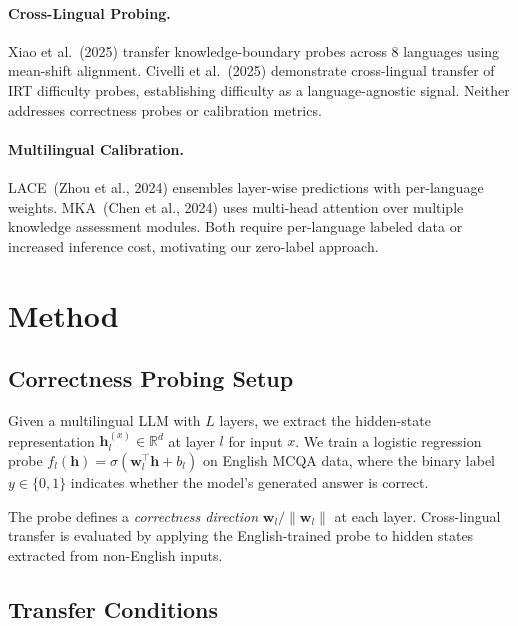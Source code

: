 \documentclass[11pt,a4paper]{article}
\begin{document}
\paragraph{Cross-Lingual Probing.}
Xiao et al.~(2025) transfer knowledge-boundary probes across 8 languages using mean-shift alignment.
Civelli et al.~(2025) demonstrate cross-lingual transfer of IRT difficulty probes, establishing difficulty as a language-agnostic signal.
Neither addresses correctness probes or calibration metrics.

\paragraph{Multilingual Calibration.}
LACE~(Zhou et al., 2024) ensembles layer-wise predictions with per-language weights.
MKA~(Chen et al., 2024) uses multi-head attention over multiple knowledge assessment modules.
Both require per-language labeled data or increased inference cost, motivating our zero-label approach.

\section{Method}
\label{sec:method}

\subsection{Correctness Probing Setup}

Given a multilingual LLM with $L$ layers, we extract the hidden-state representation $\mathbf{h}_l^{(x)} \in \mathbb{R}^d$ at layer $l$ for input $x$.
We train a logistic regression probe $f_l(\mathbf{h}) = \sigma(\mathbf{w}_l^\top \mathbf{h} + b_l)$ on English MCQA data, where the binary label $y \in \{0,1\}$ indicates whether the model's generated answer is correct.

The probe defines a \emph{correctness direction} $\mathbf{w}_l / \|\mathbf{w}_l\|$ at each layer.
Cross-lingual transfer is evaluated by applying the English-trained probe to hidden states extracted from non-English inputs.

\subsection{Transfer Conditions}
\end{document}
